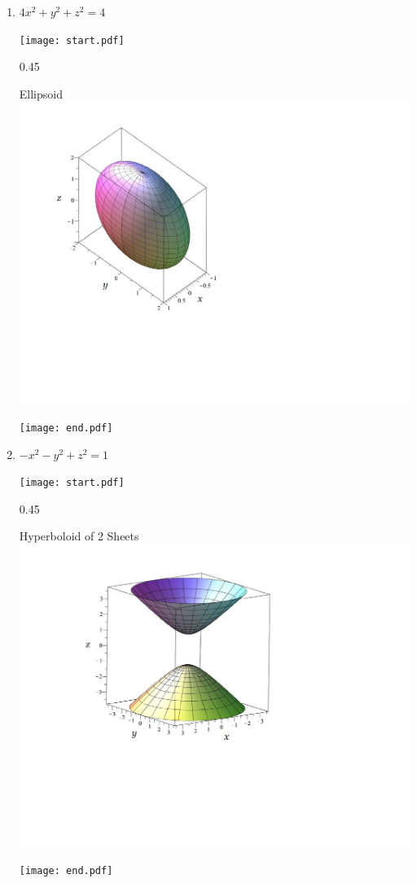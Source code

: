 \documentclass[12pt]{article}
\begin{document}
\begin{enumerate}

\item $4x^2+y^2+z^2=4$

\texttt{[image: start.pdf]}
{{{0.45\linewidth}{\begin{center}Ellipsoid\\\includegraphics[scale=0.5]{ellipsoid.pdf}\end{center}}}}
\texttt{[image: end.pdf]}


\newpage

\item $-x^2-y^2+z^2=1$

\texttt{[image: start.pdf]}
{{{0.45\linewidth}{\begin{center}Hyperboloid of 2 Sheets\\\includegraphics[scale=0.4]{hyperboloid2.pdf}\end{center}}}}
\texttt{[image: end.pdf]}



\end{enumerate}
\end{document}
